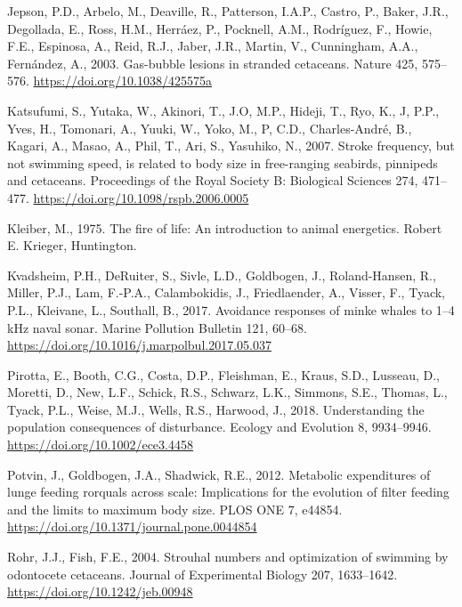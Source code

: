 \documentclass[]{elsarticle} %
\begin{document}
\hypertarget{ref-jepson_gas-bubble_2003}{}
Jepson, P.D., Arbelo, M., Deaville, R., Patterson, I.A.P., Castro, P.,
Baker, J.R., Degollada, E., Ross, H.M., Herráez, P., Pocknell, A.M.,
Rodríguez, F., Howie, F.E., Espinosa, A., Reid, R.J., Jaber, J.R.,
Martin, V., Cunningham, A.A., Fernández, A., 2003. Gas-bubble lesions in
stranded cetaceans. Nature 425, 575--576.
\url{https://doi.org/10.1038/425575a}

\hypertarget{ref-katsufumi_stroke_2007}{}
Katsufumi, S., Yutaka, W., Akinori, T., J.O, M.P., Hideji, T., Ryo, K.,
J, P.P., Yves, H., Tomonari, A., Yuuki, W., Yoko, M., P, C.D.,
Charles-André, B., Kagari, A., Masao, A., Phil, T., Ari, S., Yasuhiko,
N., 2007. Stroke frequency, but not swimming speed, is related to body
size in free-ranging seabirds, pinnipeds and cetaceans. Proceedings of
the Royal Society B: Biological Sciences 274, 471--477.
\url{https://doi.org/10.1098/rspb.2006.0005}

\hypertarget{ref-kleiber_fire_1975}{}
Kleiber, M., 1975. The fire of life: An introduction to animal
energetics. Robert E. Krieger, Huntington.

\hypertarget{ref-kvadsheim_avoidance_2017}{}
Kvadsheim, P.H., DeRuiter, S., Sivle, L.D., Goldbogen, J.,
Roland-Hansen, R., Miller, P.J., Lam, F.-P.A., Calambokidis, J.,
Friedlaender, A., Visser, F., Tyack, P.L., Kleivane, L., Southall, B.,
2017. Avoidance responses of minke whales to 1--4 kHz naval sonar.
Marine Pollution Bulletin 121, 60--68.
\url{https://doi.org/10.1016/j.marpolbul.2017.05.037}

\hypertarget{ref-pirotta_understanding_2018}{}
Pirotta, E., Booth, C.G., Costa, D.P., Fleishman, E., Kraus, S.D.,
Lusseau, D., Moretti, D., New, L.F., Schick, R.S., Schwarz, L.K.,
Simmons, S.E., Thomas, L., Tyack, P.L., Weise, M.J., Wells, R.S.,
Harwood, J., 2018. Understanding the population consequences of
disturbance. Ecology and Evolution 8, 9934--9946.
\url{https://doi.org/10.1002/ece3.4458}

\hypertarget{ref-potvin_metabolic_2012}{}
Potvin, J., Goldbogen, J.A., Shadwick, R.E., 2012. Metabolic
expenditures of lunge feeding rorquals across scale: Implications for
the evolution of filter feeding and the limits to maximum body size.
PLOS ONE 7, e44854. \url{https://doi.org/10.1371/journal.pone.0044854}

\hypertarget{ref-rohr_strouhal_2004}{}
Rohr, J.J., Fish, F.E., 2004. Strouhal numbers and optimization of
swimming by odontocete cetaceans. Journal of Experimental Biology 207,
1633--1642. \url{https://doi.org/10.1242/jeb.00948}
\end{document}
